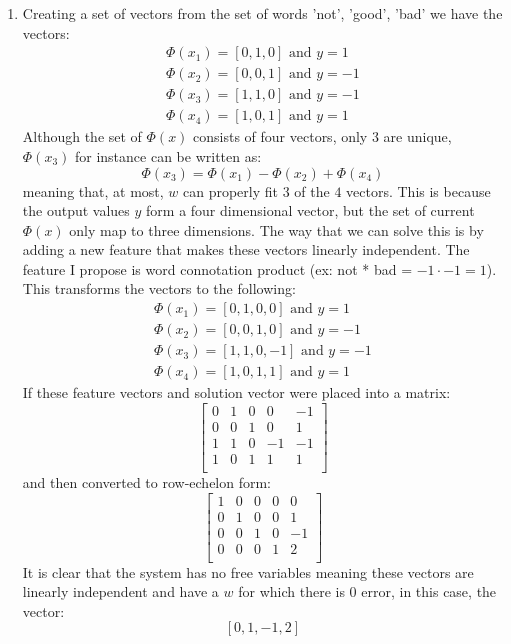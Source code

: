 \documentclass[12pt]{article}
\begin{document}
\begin{enumerate}[label=(\alph*)]
		\item Creating a set of vectors from the set of words {'not', 'good', 'bad'}
			we have the vectors:
			\begin{gather*}
				\Phi(x_1) = [0, 1, 0] \text{ and } y = 1 \\
				\Phi(x_2) = [0, 0, 1] \text{ and } y = -1 \\
				\Phi(x_3) = [1, 1, 0] \text{ and } y = -1 \\
				\Phi(x_4) = [1, 0, 1] \text{ and } y = 1
			\end{gather*}
			Although the set of \(\Phi(x)\) consists of four vectors, only 3 are
			unique, \(\Phi(x_3)\) for instance can be written as:
			\[
				\Phi(x_3) = \Phi(x_1) - \Phi(x_2) + \Phi(x_4)
			\]
			meaning that, at most, \(w\) can properly fit \(3\) of the \(4\)
			vectors. This is because the output values \(y\) form a four
			dimensional vector, but the set of current \(\Phi(x)\) only
			map to three dimensions. The way that we can solve this is by 
			adding a new feature that makes these vectors linearly independent.
			The feature I propose is word connotation product
			(ex: not * bad = \(-1 \cdot -1 = 1\)).
			This transforms the vectors to the following:
			\begin{gather*}
				\Phi(x_1) = [0, 1, 0, 0] \text{ and } y = 1 \\
				\Phi(x_2) = [0, 0, 1, 0] \text{ and } y = -1 \\
				\Phi(x_3) = [1, 1, 0, -1] \text{ and } y = -1 \\
				\Phi(x_4) = [1, 0, 1, 1] \text{ and } y = 1
			\end{gather*}
			If these feature vectors and solution vector were placed
			into a matrix:
			\[
				\left[
					\begin{array}{cccc|c}
						0 & 1 & 0 & 0 & -1 \\
						0 & 0 & 1 & 0  & 1 \\
						1 & 1 & 0 & -1 & -1 \\
						1 & 0 & 1 & 1 & 1 \\
					\end{array}
				\right]
			\]
			and then converted to row-echelon form:
			\[
				\left[
					\begin{array}{cccc|c}
						1 & 0 & 0 & 0 & 0 \\
						0 & 1 & 0 & 0  & 1 \\
						0 & 0 & 1 & 0 & -1 \\
						0 & 0 & 0 & 1 & 2 \\
					\end{array}
				\right]
			\]
			It is clear that the system has no free variables meaning
			these vectors are linearly independent and have a \(w\)
			for which there is \(0\) error, in this case, the vector:
			\[
				[0, 1, -1, 2]
			\]


\end{enumerate}
\end{document}
